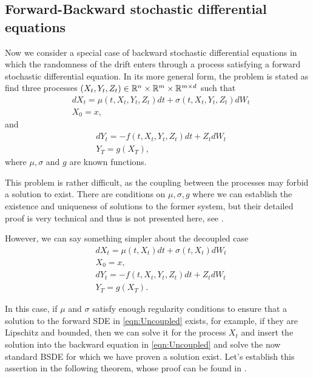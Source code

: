 \subsection{Forward-Backward stochastic differential equations}
Now we consider a special case of backward stochastic differential equations in which the randomness of the drift enters through a process satisfying a forward stochastic differential equation. In its more general form, the problem is stated as find three processes $(X_t,Y_t,Z_t)\in\mathbb{R}^n\times\mathbb{R}^m\times\mathbb{R}^{m\times d}$ such that
\begin{equation}
	\begin{split}
		&dX_t=\mu(t,X_t,Y_t,Z_t)dt+\sigma(t,X_t,Y_t,Z_t)dW_t\\
		&X_0=x,
	\end{split}
\end{equation}
and
\begin{equation}
	\begin{split}
		&dY_t=-f(t,X_t,Y_t,Z_t)dt+Z_t dW_t\\
		&Y_T=g(X_T),
	\end{split}
\end{equation}  
where $\mu,\sigma$ and $g$ are known functions.

This problem is rather difficult, as the coupling between the processes may forbid a solution to exist. There are conditions on $\mu, \sigma,g$ where we can establish the existence and uniqueness of solutions to the former system, but their detailed proof is very technical and thus is not presented here, see \cite{zhang_backward_2017}.

However, we can say something simpler about the decoupled case   
\begin{equation}
	\label{eqn:Uncoupled}
	\begin{split}
		&dX_t=\mu(t,X_t)dt+\sigma(t,X_t)dW_t\\
		&X_0=x,\\
		&dY_t=-f(t,X_t,Y_t,Z_t)dt+Z_t dW_t\\
		&Y_T=g(X_T).
	\end{split}
\end{equation}  

In this case, if $\mu$ and $\sigma$ satisfy enough regularity conditions to ensure that a solution to the forward SDE in \eqref{eqn:Uncoupled} exists, for example, if they are Lipschitz and bounded, then we can solve it for the process $X_t$ and insert the solution into the backward equation in \ref{eqn:Uncoupled} and solve the now standard BSDE for which we have proven a solution exist. Let's establish this assertion in the following theorem, whose proof can be found in \cite{zhang_backward_2017}.


